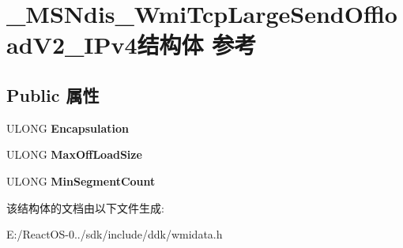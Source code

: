 \hypertarget{struct___m_s_ndis___wmi_tcp_large_send_offload_v2___i_pv4}{}\section{\+\_\+\+M\+S\+Ndis\+\_\+\+Wmi\+Tcp\+Large\+Send\+Offload\+V2\+\_\+\+I\+Pv4结构体 参考}
\label{struct___m_s_ndis___wmi_tcp_large_send_offload_v2___i_pv4}
\subsection*{Public 属性}
\begin{DoxyCompactItemize}
\item 
\mbox{\label{struct___m_s_ndis___wmi_tcp_large_send_offload_v2___i_pv4_a191c05f2d93009bcefadb880d6066942}} 
U\+L\+O\+NG {\bfseries Encapsulation}
\item 
\mbox{\label{struct___m_s_ndis___wmi_tcp_large_send_offload_v2___i_pv4_ad1763a78e40db22477bd85306cedbbc8}} 
U\+L\+O\+NG {\bfseries Max\+Off\+Load\+Size}
\item 
\mbox{\label{struct___m_s_ndis___wmi_tcp_large_send_offload_v2___i_pv4_acb5f72470b7b95e16054edf39dfab889}} 
U\+L\+O\+NG {\bfseries Min\+Segment\+Count}
\end{DoxyCompactItemize}


该结构体的文档由以下文件生成\+:\begin{DoxyCompactItemize}
\item 
E\+:/\+React\+O\+S-\/0../sdk/include/ddk/wmidata.\+h\end{DoxyCompactItemize}
